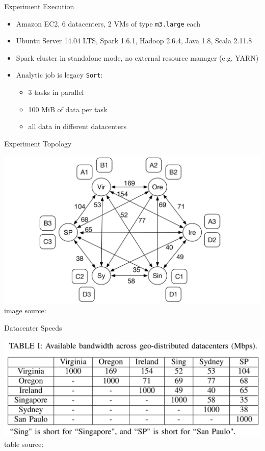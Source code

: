 \documentclass[presentation,professionalfonts]{beamer}
\begin{document}
\begin{frame}{Experiment Execution}
  \begin{itemize}
  \item Amazon EC2, 6 datacenters, 2 VMs of type \texttt{m3.large} each
  \item Ubuntu Server 14.04 LTS, Spark 1.6.1, Hadoop 2.6.4, Java 1.8, Scala 2.11.8
  \item Spark cluster in standalone mode, no external resource manager (e.g. YARN)
  \item Analytic job is legacy \texttt{Sort}:
    \begin{itemize}
    \item 3 tasks in parallel
    \item 100 MiB of data per task
    \item all data in different datacenters
    \end{itemize}
  \end{itemize}
\end{frame}

\begin{frame}{Experiment Topology}
  \begin{center}
  \includegraphics[width=1\textwidth]{alloc}\\
  image source: \textcite{Chen2017}
  \end{center}
\end{frame}

\begin{frame}{Datacenter Speeds}
  \begin{center}
  \includegraphics[width=1\textwidth]{speed}\\
  table source: \textcite{Chen2017}
  \end{center}
\end{frame}
\end{document}
